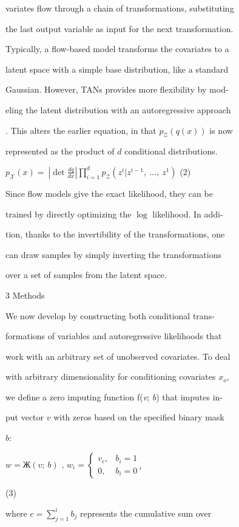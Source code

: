 \documentclass[a4paper,12pt]{article}
\begin{document}
variates flow through a chain of transformations, substituting

the last output variable as input for the next transformation.

Typically, a flow-based model transforms the covariates to a

latent space with a simple base distribution, like a standard

Gaussian. However, TANs provides more flexibility by mod-

eling the latent distribution with an autoregressive approach

. This alters the earlier equation, in that $p_{\mathcal{Z}}(q(x))$ is now

represented as the product of $d$ conditional distributions.
\begin{center}
$p_{\mathcal{X}}(x)=\displaystyle \ |\det\frac{dq}{dx}|\prod_{i=1}^{d}p_{\mathcal{Z}}(z^{i}|z^{i-1},\ \ldots,\ z^{1})$   (2)
\end{center}
Since flow models give the exact likelihood, they can be

trained by directly optimizing the $\log$ likelihood. In addi-

tion, thanks to the invertibility of the transformations, one

can draw samples by simply inverting the transformations

over a set of samples from the latent space.

3 Methods

We now develop by constructing both conditional trans-

formations of variables and autoregressive likelihoods that

work with an arbitrary set of unobserved covariates. To deal

with arbitrary dimensionality for conditioning covariates $x_{o},$

we define a zero imputing function f({\it v}; {\it b}) that imputes in-

put vector $v$ with zeros based on the specified binary mask

$b$:

$ w=Ж (v;\ b)$ , $w_{i}=\left\{\begin{array}{ll}
v_{c}, & b_{i}=1\\
0, & b_{i}=0\ '
\end{array}\right.$

(3)

where $c = \displaystyle \sum_{j=1}^{i}b_{j}$ represents the cumulative sum over
\end{document}
